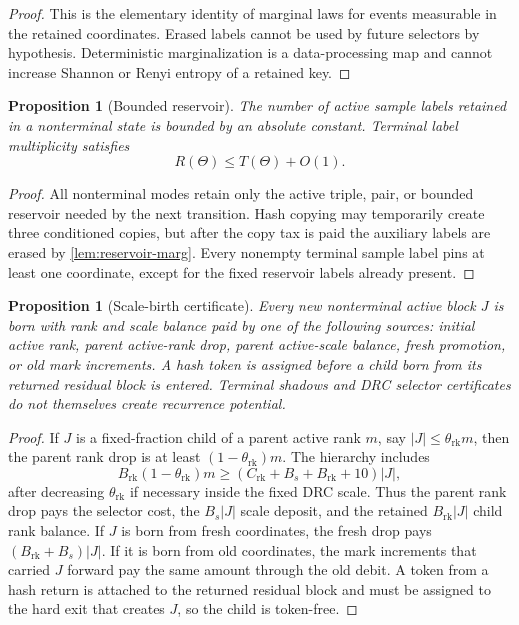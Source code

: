 \documentclass[11pt]{article}
\newcommand{\Cref}[1]{\ref{#1}}
\newtheorem{proposition}[theorem]{Proposition}
\theoremstyle{remark}
\newcommand{\rk}{\mathrm{rk}}
\begin{document}
\begin{proof}
This is the elementary identity of marginal laws for events measurable in the retained coordinates.  Erased labels cannot be used by future selectors by hypothesis.  Deterministic marginalization is a data-processing map and cannot increase Shannon or Renyi entropy of a retained key.
\end{proof}

\begin{proposition}[Bounded reservoir]\label{prop:reservoir}
The number of active sample labels retained in a nonterminal state is bounded by an absolute constant.  Terminal label multiplicity satisfies
\[
        R(\Theta)\le T(\Theta)+O(1).
\]
\end{proposition}

\begin{proof}
All nonterminal modes retain only the active triple, pair, or bounded reservoir needed by the next transition.  Hash copying may temporarily create three conditioned copies, but after the copy tax is paid the auxiliary labels are erased by \Cref{lem:reservoir-marg}.  Every nonempty terminal sample label pins at least one coordinate, except for the fixed reservoir labels already present.
\end{proof}

\begin{proposition}[Scale-birth certificate]\label{prop:scale-birth}
Every new nonterminal active block $J$ is born with rank and scale balance paid by one of the following sources: initial active rank, parent active-rank drop, parent active-scale balance, fresh promotion, or old mark increments.  A hash token is assigned before a child born from its returned residual block is entered.  Terminal shadows and DRC selector certificates do not themselves create recurrence potential.
\end{proposition}

\begin{proof}
If $J$ is a fixed-fraction child of a parent active rank $m$, say $|J|\le\theta_{\rk}m$, then the parent rank drop is at least $(1-\theta_{\rk})m$.  The hierarchy includes
\[
        B_{\rk}(1-\theta_{\rk})m
        \ge (C_{\rk}+B_s+B_{\rk}+10)|J|,
\]
after decreasing $\theta_{\rk}$ if necessary inside the fixed DRC scale.  Thus the parent rank drop pays the selector cost, the $B_s|J|$ scale deposit, and the retained $B_{\rk}|J|$ child rank balance.  If $J$ is born from fresh coordinates, the fresh drop pays $(B_{\rk}+B_s)|J|$.  If it is born from old coordinates, the mark increments that carried $J$ forward pay the same amount through the old debit.  A token from a hash return is attached to the returned residual block and must be assigned to the hard exit that creates $J$, so the child is token-free.
\end{proof}
\end{document}
